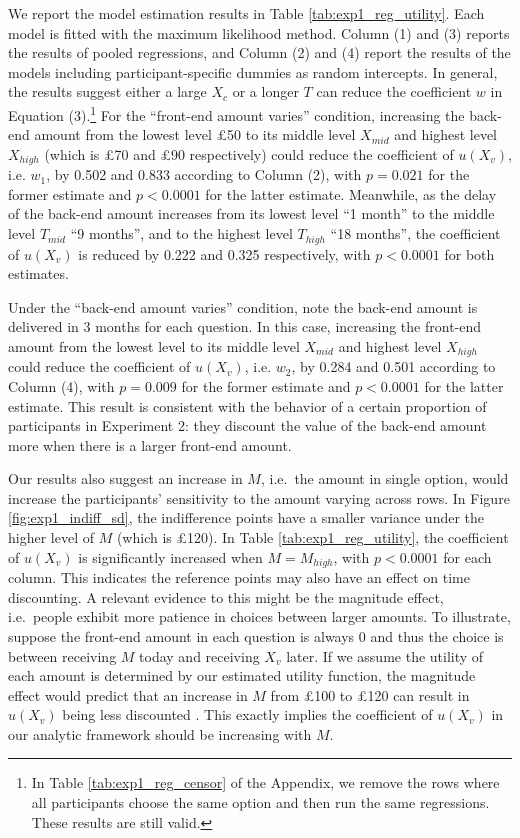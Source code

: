 \documentclass[
  12pt,
]{article}
\begin{document}
We report the model estimation results in Table
\ref{tab:exp1_reg_utility}. Each model is fitted with the maximum
likelihood method. Column (1) and (3) reports the results of pooled
regressions, and Column (2) and (4) report the results of the models
including participant-specific dummies as random intercepts. In general,
the results suggest either a large \(X_c\) or a longer \(T\) can reduce
the coefficient \(w\) in Equation (3).\footnote{In Table
  \ref{tab:exp1_reg_censor} of the Appendix, we remove the rows where
  all participants choose the same option and then run the same
  regressions. These results are still valid.} For the ``front-end
amount varies'' condition, increasing the back-end amount from the
lowest level £50 to its middle level \(X_{mid}\) and highest level
\(X_{high}\) (which is £70 and £90 respectively) could reduce the
coefficient of \(u(X_v)\), i.e. \(w_1\), by 0.502 and 0.833 according to
Column (2), with \(p=0.021\) for the former estimate and \(p<0.0001\)
for the latter estimate. Meanwhile, as the delay of the back-end amount
increases from its lowest level ``1 month'' to the middle level
\(T_{mid}\) ``9 months'', and to the highest level \(T_{high}\) ``18
months'', the coefficient of \(u(X_v)\) is reduced by 0.222 and 0.325
respectively, with \(p<0.0001\) for both estimates.

Under the ``back-end amount varies'' condition, note the back-end amount
is delivered in 3 months for each question. In this case, increasing the
front-end amount from the lowest level to its middle level \(X_{mid}\)
and highest level \(X_{high}\) could reduce the coefficient of
\(u(X_v)\), i.e. \(w_2\), by 0.284 and 0.501 according to Column (4),
with \(p=0.009\) for the former estimate and \(p<0.0001\) for the latter
estimate. This result is consistent with the behavior of a certain
proportion of participants in Experiment 2: they discount the value of
the back-end amount more when there is a larger front-end amount.



Our results also suggest an increase in \(M\), i.e.~the amount in single
option, would increase the participants' sensitivity to the amount
varying across rows. In Figure \ref{fig:exp1_indiff_sd}, the
indifference points have a smaller variance under the higher level of
\(M\) (which is £120). In Table \ref{tab:exp1_reg_utility}, the
coefficient of \(u(X_v)\) is significantly increased when
\(M=M_{high}\), with \(p<0.0001\) for each column. This indicates the
reference points may also have an effect on time discounting. A relevant
evidence to this might be the magnitude effect, i.e.~people exhibit more
patience in choices between larger amounts. To illustrate, suppose the
front-end amount in each question is always 0 and thus the choice is
between receiving \(M\) today and receiving \(X_v\) later. If we assume
the utility of each amount is determined by our estimated utility
function, the magnitude effect would predict that an increase in \(M\)
from £100 to £120 can result in \(u(X_v)\) being less discounted
\citep{andersen2013discounting}. This exactly implies the coefficient of
\(u(X_v)\) in our analytic framework should be increasing with \(M\).
\end{document}
